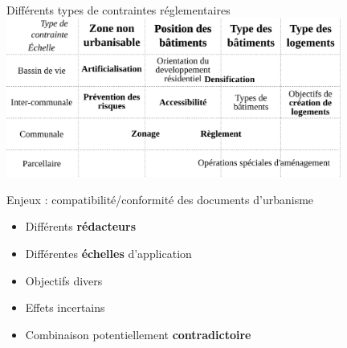\documentclass[xcolor=table]{beamer}
\begin{document}
\begin{frame}{Différents types de contraintes réglementaires} 
	\includegraphics[width=11cm]{Images/synthese-doc.png}
\end{frame}


\begin{frame}{Enjeux : compatibilité/conformité des documents d'urbanisme}
	\begin{itemize}
		\item Différents \textbf{rédacteurs}
		\item Différentes \textbf{échelles} d'application
		\item Objectifs divers
		\item Effets incertains 
		\item Combinaison potentiellement \textbf{contradictoire}
	\end{itemize}
\end{frame}
\end{document}
